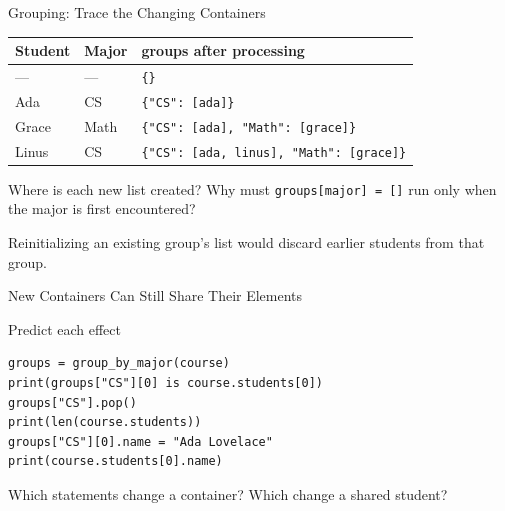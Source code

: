 \documentclass[aspectratio=169,10pt]{beamer}
\begin{document}
\begin{frame}{Grouping: Trace the Changing Containers}
\small
\begin{center}
\begin{tabular}{lll}
\textbf{Student} & \textbf{Major} & \textbf{groups after processing}\\\hline
--- & --- & \texttt{\{\}}\\
Ada & CS & \texttt{\{"CS": [ada]\}}\\
Grace & Math & \texttt{\{"CS": [ada], "Math": [grace]\}}\\
Linus & CS & \texttt{\{"CS": [ada, linus], "Math": [grace]\}}
\end{tabular}
\end{center}
\begin{activity}
Where is each new list created? Why must \texttt{groups[major] = []} run only when the major is first encountered?
\end{activity}
\begin{keyidea}Reinitializing an existing group's list would discard earlier students from that group.\end{keyidea}
\end{frame}

\begin{frame}[fragile]{New Containers Can Still Share Their Elements}
\small
\begin{block}{Predict each effect}
\footnotesize
\begin{verbatim}
groups = group_by_major(course)
print(groups["CS"][0] is course.students[0])
groups["CS"].pop()
print(len(course.students))
groups["CS"][0].name = "Ada Lovelace"
print(course.students[0].name)
\end{verbatim}
\end{block}
\begin{activity}Which statements change a container? Which change a shared student?\end{activity}
\end{frame}
\end{document}
